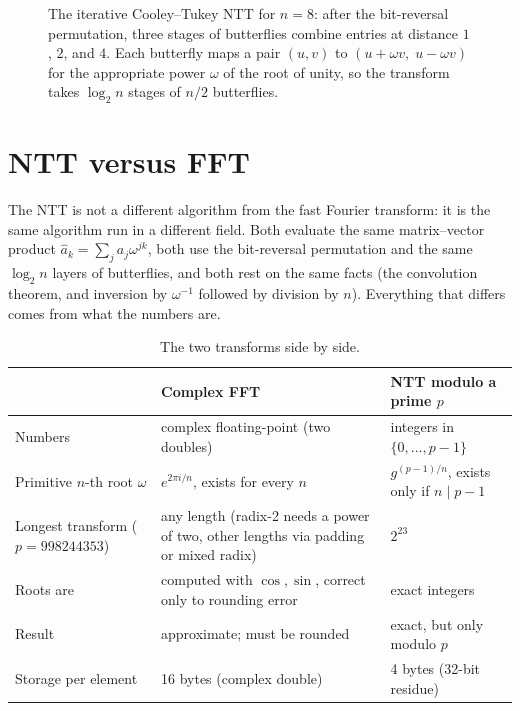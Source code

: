 \documentclass[11pt]{article}
\begin{document}
\begin{figure}[H]
\caption{The iterative Cooley--Tukey NTT for $n=8$: after the bit-reversal permutation, three stages of butterflies combine entries at distance $1$, $2$, and $4$. Each butterfly maps a pair $(u,v)$ to $(u+\omega v,\;u-\omega v)$ for the appropriate power $\omega$ of the root of unity, so the transform takes $\log_2 n$ stages of $n/2$ butterflies.}\label{fig:ntt_butterfly}
\end{figure}

\section{NTT versus FFT}
The NTT is not a different algorithm from the fast Fourier transform: it is the same algorithm run in a different field. Both evaluate the same
matrix--vector product $\hat a_k=\sum_j a_j\omega^{jk}$, both use the bit-reversal permutation and the same $\log_2 n$ layers of butterflies, and both rest on the
same facts (the convolution theorem, and inversion by $\omega^{-1}$ followed by division by $n$). Everything that differs comes from what the numbers are.

\begin{table}[H]
\centering
\small\sffamily\renewcommand{\arraystretch}{1.25}
\begin{tabular}{@{}p{3.2cm}p{5.6cm}p{5.6cm}@{}}
\toprule
 & \textbf{Complex FFT} & \textbf{NTT modulo a prime $p$} \\
\midrule
Numbers & complex floating-point (two doubles) & integers in $\{0,\dots,p-1\}$ \\
Primitive $n$-th root $\omega$ & $e^{2\pi i/n}$, exists for every $n$ & $g^{(p-1)/n}$, exists only if $n\mid p-1$ \\
Longest transform ($p=998244353$) & any length (radix-2 needs a power of two, other lengths via padding or mixed radix) & $2^{23}$ \\
Roots are & computed with $\cos,\sin$, correct only to rounding error & exact integers \\
Result & approximate; must be rounded & exact, but only modulo $p$ \\
Storage per element & 16 bytes (complex double) & 4 bytes (32-bit residue) \\
\bottomrule
\end{tabular}
\caption{The two transforms side by side.}
\end{table}
\end{document}

